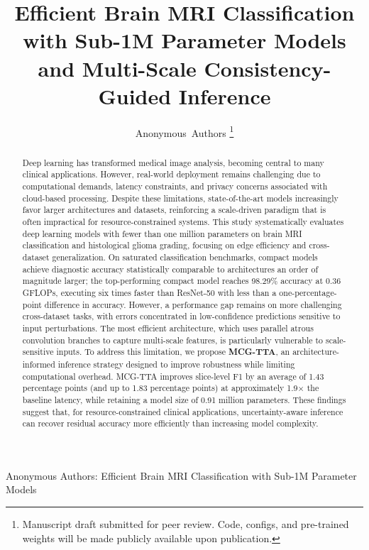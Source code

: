 \documentclass[journal]{IEEEtran}
\begin{document}
\title{Efficient Brain MRI Classification with Sub-1M Parameter Models and Multi-Scale Consistency-Guided Inference}

\author{Anonymous~Authors%
\thanks{Manuscript draft submitted for peer review. Code, configs, and pre-trained weights will be made publicly available upon publication.}}

%
{Anonymous Authors: Efficient Brain MRI Classification with Sub-1M Parameter Models}

\maketitle


\begin{abstract}
Deep learning has transformed medical image analysis, becoming central to many clinical applications. However, real-world deployment remains challenging due to computational demands, latency constraints, and privacy concerns associated with cloud-based processing. Despite these limitations, state-of-the-art models increasingly favor larger architectures and datasets, reinforcing a scale-driven paradigm that is often impractical for resource-constrained systems.
This study systematically evaluates deep learning models with fewer than one million parameters on brain MRI classification and histological glioma grading, focusing on edge efficiency and cross-dataset generalization. On saturated classification benchmarks, compact models achieve diagnostic accuracy statistically comparable to architectures an order of magnitude larger; the top-performing compact model reaches 98.29\% accuracy at 0.36 GFLOPs, executing six times faster than ResNet-50 with less than a one-percentage-point difference in accuracy. 
However, a performance gap remains on more challenging cross-dataset tasks, with errors concentrated in low-confidence predictions sensitive to input perturbations. The most efficient architecture, which uses parallel atrous convolution branches to capture multi-scale features, is particularly vulnerable to scale-sensitive inputs.
To address this limitation, we propose \textbf{MCG-TTA}, an architecture-informed inference strategy designed to improve robustness while limiting computational overhead. MCG-TTA improves slice-level F1 by an average of 1.43 percentage points (and up to 1.83 percentage points) at approximately 1.9$\times$ the baseline latency, while retaining a model size of 0.91 million parameters. These findings suggest that, for resource-constrained clinical applications, uncertainty-aware inference can recover residual accuracy more efficiently than increasing model complexity.
\end{abstract}
\end{document}
